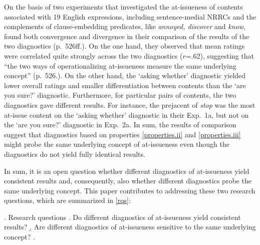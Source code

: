 \documentclass[times,linguex]{glossa}
\begin{document}


On the basis of two experiments that investigated the at-issueness of contents associated with 19 English expressions, including sentence-medial NRRCs and the complements of clause-embedding predicates, like \emph{annoyed, discover} and \emph{know}, \citet{tonhauser_how_2018} found both convergence and divergence in their comparison of the results of the two diagnostics (p.~526ff.). On the one hand, they observed that mean ratings were correlated quite strongly across the two diagnostics ($r$=.62), suggesting that ``the two ways of operationalizing at-issueness measure the same underlying concept'' (p.~526.). On the other hand, the `asking whether' diagnostic yielded lower overall ratings and smaller differentiation between contents than the `are you sure?' diagnostic. Furthermore, for particular pairs of contents, the two diagnostics  gave different results. For instance, the prejacent of \emph{stop} was the most at-issue content on the `asking whether' diagnostic in their Exp.~1a, but not on the `are you sure?' diagnostic in Exp.~2a. In sum, the results of  comparison suggest that diagnostics based on properties \ref{properties.ii} and \ref{properties.iii} might probe the same underlying concept of at-issueness even though the diagnostics do not yield fully identical results.

In sum, it is an open question whether different diagnostics of at-issueness yield consistent results and, consequently, also whether different diagnostics probe the same underlying concept. This paper contributes to addressing these two research questions, which are summarized in \ref{rqs}:

\ex.\label{rqs} Research questions
\a.\label{rqa} Do different diagnostics of at-issueness yield consistent results?
\b.\label{rqb} Are different diagnostics of at-issueness sensitive to the same underlying concept?
\z.
\end{document}
